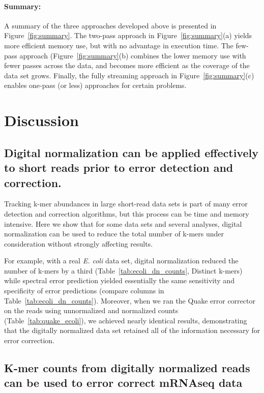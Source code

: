 \documentclass{article}
\begin{document}
\paragraph{Summary:} A summary of the three approaches developed above
is presented in Figure~\ref{fig:summary}.  The two-pass approach in
Figure~\ref{fig:summary}(a) yields more efficient memory use, but with
no advantage in execution time.  The few-pass approach
(Figure~\ref{fig:summary}(b) combines the lower memory use with fewer
passes across the data, and becomes more efficient as the coverage of
the data set grows.  Finally, the fully streaming approach in
Figure~\ref{fig:summary}(c) enables one-pass (or less) approaches for
certain problems.

\section{Discussion}

\subsection{Digital normalization can be applied effectively to short reads prior to error detection and correction.}

Tracking k-mer abundances in large short-read data sets is part of
many error detection and correction algorithms, but this process can
be time and memory intensive.  Here we show that for some data sets
and several analyses, digital normalization can be used to reduce the
total number of k-mers under consideration without strongly affecting
results.

For example, with a real {\em E. coli} data set, digital normalization
reduced the number of k-mers by a third
(Table~\ref{tab:ecoli_dn_counts}, Distinct k-mers) while spectral
error prediction yielded essentially the same sensitivity and
specificity of error predictions (compare columns in
Table~\ref{tab:ecoli_dn_counts}).  Moreover, when we ran the Quake
error corrector on the reads using unnormalized and normalized counts
(Table~\ref{tab:quake_ecoli}), we achieved nearly identical results,
demonstrating that the digitally normalized data set retained all of the
information necessary for error correction.

\subsection{K-mer counts from digitally normalized reads can be used to error correct mRNAseq data}
\end{document}

